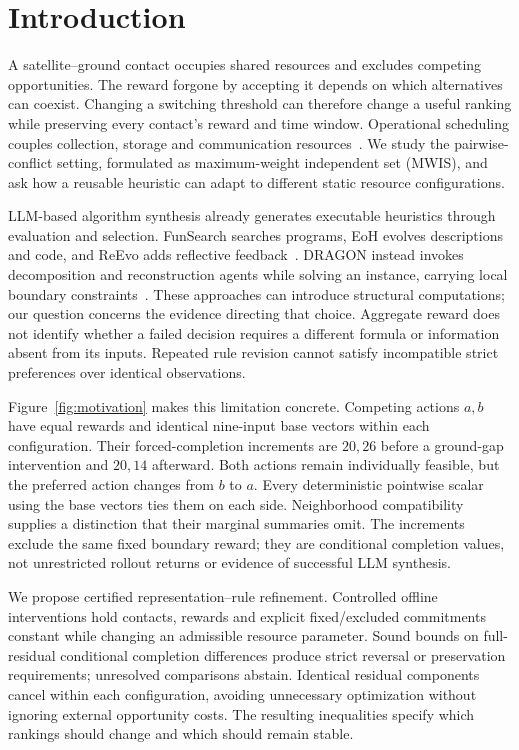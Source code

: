 \section{Introduction}
\label{sec:introduction}

A satellite--ground contact occupies shared resources and excludes competing
opportunities. The reward forgone by accepting it depends on which alternatives
can coexist. Changing a switching threshold can therefore change a useful
ranking while preserving every contact's reward and time window. Operational
scheduling couples collection, storage and communication resources~\cite{augenstein2016optimal,levinson2025optimal}.
We study the pairwise-conflict setting, formulated as maximum-weight independent
set (MWIS), and ask how a reusable heuristic can adapt to different static
resource configurations.

LLM-based algorithm synthesis already generates executable heuristics through
evaluation and selection. FunSearch searches programs, EoH evolves descriptions
and code, and ReEvo adds reflective feedback~\cite{romeraparedes2024funsearch,liu2024eoh,ye2024reevo}.
DRAGON instead invokes decomposition and reconstruction agents while solving
an instance, carrying local boundary constraints~\cite{chen2026dragon}.
These approaches can introduce structural computations; our question concerns
the evidence directing that choice. Aggregate reward does not identify whether
a failed decision requires a different formula or information absent from its
inputs. Repeated rule revision cannot satisfy incompatible strict preferences
over identical observations.

Figure~\ref{fig:motivation} makes this limitation concrete. Competing actions
$a,b$ have equal rewards and identical nine-input base vectors within each
configuration. Their forced-completion increments are $20,26$ before a
ground-gap intervention and $20,14$ afterward. Both actions remain individually
feasible, but the preferred action changes from $b$ to $a$. Every deterministic
pointwise scalar using the base vectors ties them on each side. Neighborhood
compatibility supplies a distinction that their marginal summaries omit.
The increments exclude the same fixed boundary reward; they are conditional
completion values, not unrestricted rollout returns or evidence of successful
LLM synthesis.

We propose certified representation--rule refinement. Controlled offline
interventions hold contacts, rewards and explicit fixed/excluded commitments
constant while changing an admissible resource parameter. Sound bounds on
full-residual conditional completion differences produce strict reversal or
preservation requirements; unresolved comparisons abstain. Identical residual
components cancel within each configuration, avoiding unnecessary optimization
without ignoring external opportunity costs. The resulting inequalities specify
which rankings should change and which should remain stable.

